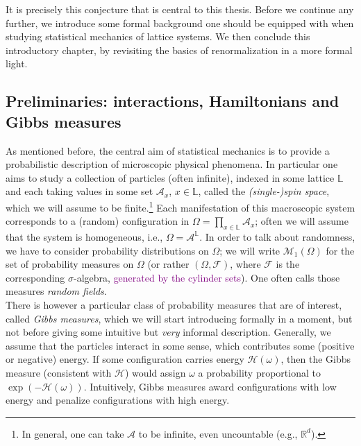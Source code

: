 \documentclass[12pt]{article}
\newcommand{\A}{\mathcal{A}}
\newcommand{\F}{\mathcal{F}}
\renewcommand{\H}{\mathcal{H}}
\renewcommand{\L}{\mathbb{L}}
\newcommand{\M}{\mathcal{M}}
\newcommand{\R}{\mathbb{R}}
\newcommand{\1}{\mathbbm{1}}
\newcommand{\5}{\vspace{0.5cm}}
\theoremstyle{definition}
\begin{document}
It is precisely this conjecture that is central to this thesis. Before we continue any further, we introduce some formal background one should be equipped with when studying statistical mechanics of lattice systems. We then conclude this introductory chapter, by revisiting the basics of renormalization in a more formal light.


\subsection{Preliminaries: interactions, Hamiltonians and Gibbs measures}

As mentioned before, the central aim of statistical mechanics is to provide a probabilistic description of microscopic physical phenomena. In particular one aims to study a collection of particles (often infinite), indexed in some lattice $\L$ and each taking values in some set $\A_x$, $x\in\L$, called the \textit{(single-)spin space}, which we will assume to be finite.\footnote{In general, one can take $\A$ to be infinite, even uncountable (e.g., $\R^d$).} Each manifestation of this macroscopic system corresponds to a (random) configuration in $\Omega=\prod_{x\in\L}\A_x$; often we will assume that the system is homogeneous, i.e., $\Omega=\A^{\L}$. In order to talk about randomness, we have to consider probability distributions on $\Omega$; we will write $\M_1(\Omega)$ for the set of probability measures on $\Omega$ (or rather $(\Omega,\F)$, where $\F$ is the  corresponding $\sigma$-algebra, \textcolor{purple}{generated by the cylinder sets}). One often calls those measures \textit{random fields}. \\

There is however a particular class of probability measures that are of interest, called \textit{Gibbs measures}, which we will start introducing formally in a moment, but not before giving some intuitive but \textit{very} informal description. Generally, we assume that the particles interact in some sense, which contributes some (positive or negative) energy. If some configuration carries energy $\H(\omega)$, then the Gibbs measure (consistent with $\H$) would assign $\omega$ a probability proportional to $\exp(-\H(\omega))$. Intuitively, Gibbs measures award configurations with low energy and penalize configurations with high energy. 

\end{document}
